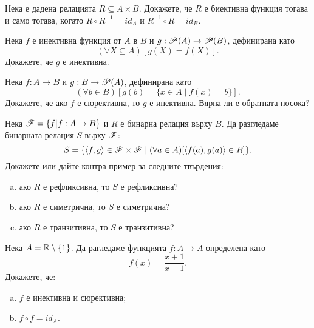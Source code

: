 

\begin{problem}
  Нека е дадена релацията $R\subseteq A\times B$.
  Докажете, че $R$ е биективна функция тогава и само тогава, когато $R\circ R^{-1} = id_A$ и $R^{-1}\circ R = id_B$.
\end{problem}

\begin{problem}
  Нека $f$ е инективна функция от $A$ в $B$ и $g:\mathscr{P}(A) \rightarrow \mathscr{P}(B)$, дефинирана като 
  \[(\forall X \subseteq A)[g(X) = f(X)].\]
  Докажете, че $g$ е инективна.
\end{problem}

\begin{problem}
  Нека $f:A\rightarrow B$ и $g:B\rightarrow\mathscr{P}(A)$, дефинирана като 
  \[(\forall b \in B)[g(b) = \{x\in A\mid f(x) = b\}].\]
  Докажете, че ако $f$ е сюрективна, то $g$ е инективна.
  Вярна ли е обратната посока?
\end{problem}

\begin{problem}
  Нека $\mathscr{F} = \{f| f:A\to B\}$ и $R$ е бинарна релация върху $B$.
  Да разгледаме бинарната релация $S$ върху $\mathscr{F}$:
  \[S = \{\langle{f,g}\rangle\in \mathscr{F}\times \mathscr{F} \mid (\forall a\in A)[\langle{f(a),g(a)}\rangle \in R]\}.\]
  Докажете или дайте контра-пример за следните твърдения:
  \begin{enumerate}[a)]
  \item 
    ако $R$ е рефликсивна, то $S$ е рефликсивна?
  \item 
    ако $R$ е симетрична, то $S$ е симетрична?
  \item 
    ако $R$ е транзитивна, то $S$ е транзитивна?
  \end{enumerate}
\end{problem}

\begin{problem}
  Нека $A = \mathbb{R} \setminus \{1\}$.
  Да рагледаме функцията $f: A \to A$ определена като
  \[f(x) = \frac{x+1}{x-1}.\]
  Докажете, че:
  \begin{enumerate}[a)]
  \item 
    $f$ е инективна и сюрективна;
  \item
    $f\circ f = id_A$.
  \end{enumerate}
\end{problem}

